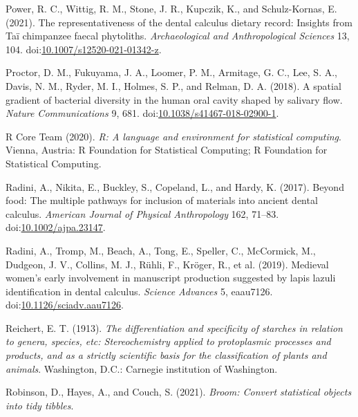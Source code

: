 \documentclass[utf8]{frontiers/frontiersSCNS}
\newlength{\cslhangindent}
\newlength{\cslentryspacingunit} %
\newenvironment{CSLReferences}[2] %
 {%
  \setlength{\parindent}{0pt}
  \ifodd #1
  \let\oldpar\par
  \def\par{\hangindent=\cslhangindent\oldpar}
  \fi
  \setlength{\parskip}{#2\cslentryspacingunit}
 }%
 {}
\begin{document}
\begin{CSLReferences}{1}{0}
\leavevmode{}%
Power, R. C., Wittig, R. M., Stone, J. R., Kupczik, K., and Schulz-Kornas, E. (2021). The representativeness of the dental calculus dietary record: Insights from {Taï} chimpanzee faecal phytoliths. \emph{Archaeological and Anthropological Sciences} 13, 104. doi:\href{https://doi.org/10.1007/s12520-021-01342-z}{10.1007/s12520-021-01342-z}.

\leavevmode{}%
Proctor, D. M., Fukuyama, J. A., Loomer, P. M., Armitage, G. C., Lee, S. A., Davis, N. M., Ryder, M. I., Holmes, S. P., and Relman, D. A. (2018). A spatial gradient of bacterial diversity in the human oral cavity shaped by salivary flow. \emph{Nature Communications} 9, 681. doi:\href{https://doi.org/10.1038/s41467-018-02900-1}{10.1038/s41467-018-02900-1}.

\leavevmode{}%
R Core Team (2020). \emph{R: {A} language and environment for statistical computing}. {Vienna, Austria}: {R Foundation for Statistical Computing}; {R Foundation for Statistical Computing}.

\leavevmode{}%
Radini, A., Nikita, E., Buckley, S., Copeland, L., and Hardy, K. (2017). Beyond food: {The} multiple pathways for inclusion of materials into ancient dental calculus. \emph{American Journal of Physical Anthropology} 162, 71--83. doi:\href{https://doi.org/10.1002/ajpa.23147}{10.1002/ajpa.23147}.

\leavevmode{}%
Radini, A., Tromp, M., Beach, A., Tong, E., Speller, C., McCormick, M., Dudgeon, J. V., Collins, M. J., Rühli, F., Kröger, R., et al. (2019). Medieval women's early involvement in manuscript production suggested by lapis lazuli identification in dental calculus. \emph{Science Advances} 5, eaau7126. doi:\href{https://doi.org/10.1126/sciadv.aau7126}{10.1126/sciadv.aau7126}.

\leavevmode{}%
Reichert, E. T. (1913). \emph{The differentiation and specificity of starches in relation to genera, species, etc: Stereochemistry applied to protoplasmic processes and products, and as a strictly scientific basis for the classification of plants and animals}. {Washington, D.C.}: {Carnegie institution of Washington}.

\leavevmode{}%
Robinson, D., Hayes, A., and Couch, S. (2021). \emph{Broom: {Convert} statistical objects into tidy tibbles}.


\end{CSLReferences}
\end{document}
